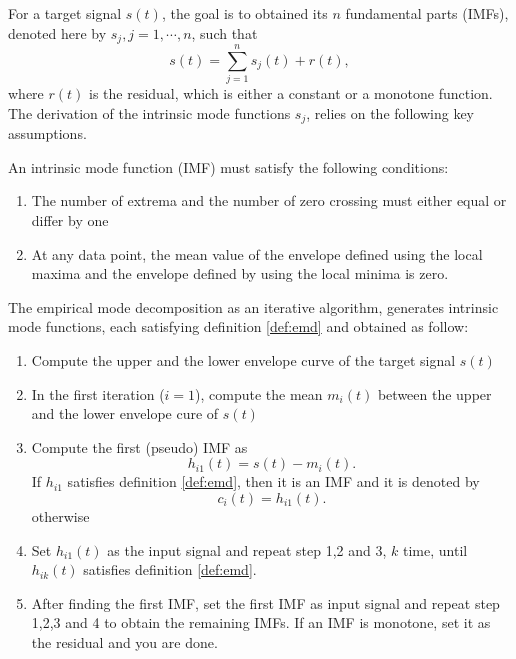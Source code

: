 \documentclass[../Main/thesis.tex]{subfiles}
\begin{document}
\justify
 For a target signal $s(t)$, the goal is to obtained its $n$ fundamental parts (IMFs), denoted here by $s_{j}, j =1,\cdots,n$, such that
\begin{equation}\label{eq:emd-decomposition}
s(t) = \sum_{j=1}^{n}s_{j}(t) + r(t),
\end{equation}
where $r(t)$ is the residual, which is either a constant or a monotone function. The derivation of the intrinsic mode functions $s_{j}$, relies on the following key assumptions.
\begin{definition}\label{def:emd}
An intrinsic mode function (IMF) must satisfy the following conditions:
\begin{enumerate}
\item The number of extrema and the number of zero crossing must either equal or differ by one 
\item At any data point, the mean value of the envelope defined using the local maxima and the envelope defined by using the local minima is zero.
\end{enumerate}
\end{definition}
The empirical mode decomposition as an iterative algorithm, generates intrinsic mode functions, each satisfying definition \ref{def:emd} and obtained as follow:
\begin{enumerate}
	\item Compute the upper and the lower envelope curve of the target signal $s(t)$
	\item In the first iteration ($i=1$), compute the mean $m_{i}(t)$ between the upper and the lower envelope cure of $s(t)$
	\item Compute the first (pseudo) IMF as 
	\begin{equation}\label{eq:proto}
		h_{i1}(t) = s(t)-m_{i}(t).
	\end{equation}
	If $h_{i1}$ satisfies definition \ref{def:emd}, then it is an IMF and it is denoted by 
	\begin{equation}\label{eq:imf}
		c_{i}(t) = h_{i1}(t).
	\end{equation}
	otherwise
	
	\item Set $h_{i1}(t)$ as the input signal and repeat step 1,2 and 3, $k$ time, until $h_{ik}(t)$ satisfies definition \ref{def:emd}.
	\item After finding the first IMF, set the first IMF as input signal and repeat step 1,2,3 and 4 to obtain the remaining IMFs. If an IMF is monotone, set it as the residual and you are done.
\end{enumerate}
\end{document}
